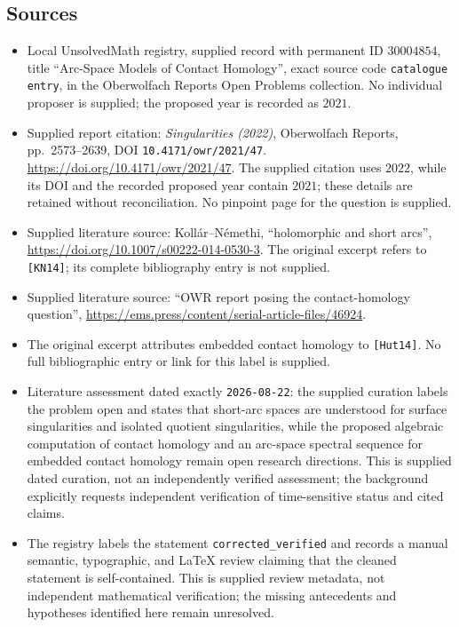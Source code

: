 \documentclass[11pt]{article}
\begin{document}
\subsection{Sources}
\begin{itemize}
\item Local UnsolvedMath registry, supplied record with permanent ID \(30004854\), title ``Arc-Space Models of Contact Homology'', exact source code \texttt{catalogue entry}, in the Oberwolfach Reports Open Problems collection. No individual proposer is supplied; the proposed year is recorded as \(2021\).
\item Supplied report citation: \emph{Singularities (2022)}, Oberwolfach Reports, pp.\ 2573--2639, DOI \texttt{10.4171/owr/2021/47}. \url{https://doi.org/10.4171/owr/2021/47}. The supplied citation uses \(2022\), while its DOI and the recorded proposed year contain \(2021\); these details are retained without reconciliation. No pinpoint page for the question is supplied.
\item Supplied literature source: Koll\'ar--N\'emethi, ``holomorphic and short arcs'', \url{https://doi.org/10.1007/s00222-014-0530-3}. The original excerpt refers to \texttt{[KN14]}; its complete bibliography entry is not supplied.
\item Supplied literature source: ``OWR report posing the contact-homology question'', \url{https://ems.press/content/serial-article-files/46924}.
\item The original excerpt attributes embedded contact homology to \texttt{[Hut14]}. No full bibliographic entry or link for this label is supplied.
\item Literature assessment dated exactly \texttt{2026-08-22}: the supplied curation labels the problem open and states that short-arc spaces are understood for surface singularities and isolated quotient singularities, while the proposed algebraic computation of contact homology and an arc-space spectral sequence for embedded contact homology remain open research directions. This is supplied dated curation, not an independently verified assessment; the background explicitly requests independent verification of time-sensitive status and cited claims.
\item The registry labels the statement \texttt{corrected\_verified} and records a manual semantic, typographic, and LaTeX review claiming that the cleaned statement is self-contained. This is supplied review metadata, not independent mathematical verification; the missing antecedents and hypotheses identified here remain unresolved.
\end{itemize}
\end{document}
